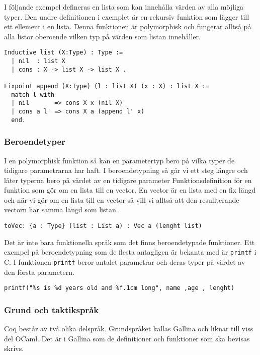 I följande exempel defineras en lista som kan innehålla värden av alla möjliga
typer. Den undre definitionen i exemplet är en rekursiv funktion som lägger till
ett ellement i en lista. Denna funktionen är polymorphisk och fungerar alltså på
alla listor oberoende vilken typ på värden som listan innehåller.
\begin{verbatim}
Inductive list (X:Type) : Type :=
  | nil  : list X
  | cons : X -> list X -> list X .

Fixpoint append (X:Type) (l : list X) (x : X) : list X :=
  match l with
  | nil       => cons X x (nil X)
  | cons a l' => cons X a (append l' x)
  end.
\end{verbatim}

\subsubsection{Beroendetyper}
I en polymorphisk funktion så kan en parametertyp bero på vilka typer de
tidigare parametrarna har haft. I beroendetypning så går vi ett steg längre och
låter typerna bero på värdet av en tidigare parameter
Funktionsdefinition för en funktion som gör om en lista till en vector. En
vector är en lista med en fix längd och när vi gör om en lista till en vector
så vill vi alltså att den resullterande vectorn har samma längd som listan.
\begin{verbatim}
toVec: {a : Type} (list : List a) : Vec a (lenght list)
\end{verbatim}

Det är inte bara funktionella språk som det finns beroendetypade funktioner.
Ett exempel på beroendetypning som de flesta antagligen är bekanta med är
\texttt{printf} i C. I funktionen \texttt{printf} beror antalet parametrar och
deras typer på värdet av den första parametern.

\begin{verbatim}
printf("%s is %d years old and %f.1cm long", name ,age , lenght)
\end{verbatim}

\begin{comment}
CoqArt
http://mattam.org/research/publications/Programming_with_Dependent_Types_in_Coq-PPS-260209.pdf
** DONE Grund och taktikspråk
   CLOSED: [2013-05-10 fre 10:41]
\end{comment}

\subsubsection{Grund och taktikspråk}
Coq består av två olika delspråk. Grundspråket kallas Gallina och liknar till
viss del OCaml. Det är i Gallina som de definitioner och funktioner som ska
bevisas skrivs.

